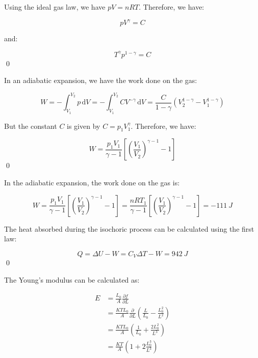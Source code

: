 \documentclass[12pt]{article}
\begin{document}
Using the ideal gas law, we have $pV = nRT$. Therefore, we have:

\begin{equation}
    pV^{\gamma} = C
\end{equation}

and:

\begin{equation}
    T^{\gamma} p^{1 - \gamma} = C
\end{equation}
\qed


In an adiabatic expansion, we have the work done on the gas:

\begin{equation}
    W = -\int_{V_{1}}^{V_{2}} p \, \mathrm{d}V = -\int_{V_{1}}^{V_{2}} C V^{-\gamma} \, \mathrm{d}V = \frac{C}{1 - \gamma} \left( V_{2}^{1 - \gamma} - V_{1}^{1 - \gamma} \right)
\end{equation}

But the constant $C$ is given by $C = p_{1} V_{1}^{\gamma}$. Therefore, we have:

\begin{equation}
    W = \frac{p_{1}V_{1}}{\gamma - 1} \left[ \left( \frac{V_{1}}{V_{2}} \right)^{\gamma - 1} - 1 \right]
\end{equation}
\qed


In the adiabatic expansion, the work done on the gas is:

\begin{equation}
    W = \frac{p_{1}V_{1}}{\gamma - 1} \left[ \left( \frac{V_{1}}{V_{2}} \right)^{\gamma - 1} - 1 \right] = \frac{nRT_{1}}{\gamma - 1} \left[ \left( \frac{V_{1}}{V_{2}} \right)^{\gamma - 1} - 1 \right] = \qty{-111}{J}
\end{equation}

The heat absorbed during the isochoric process can be calculated using the first law:

\begin{equation}
    Q = \Delta U - W = C_{V} \Delta T - W = \qty{942}{J}
\end{equation}
\qed


The Young's modulus can be calculated as:

\begin{equation}
\begin{split}
    E &= \frac{L_{0}}{A} \frac{\partial f}{\partial L} \\
    &= \frac{KTL_{0}}{A} \frac{\partial}{\partial L} \left( \frac{L}{L_{0}} - \frac{L_{0}^{2}}{L^{2}} \right) \\
    &= \frac{KTL_{0}}{A} \left( \frac{1}{L_{0}} + \frac{2L_{0}^{2}}{L^{3}} \right) \\
    &= \frac{KT}{A} \left( 1 + 2 \frac{L_{0}^{3}}{L^{3}} \right)
\end{split}
\end{equation}
\end{document}
